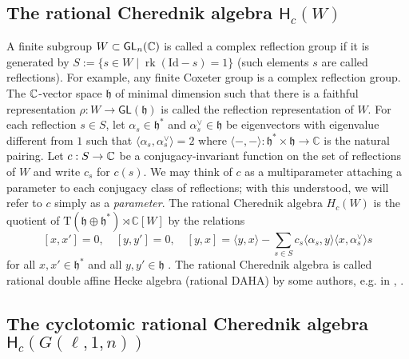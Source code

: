 \documentclass[12pt]{amsart}
\numberwithin{equation}{section}
\theoremstyle{definition}
\newcommand{\hstar}{\mathfrak{h}^*}
\newcommand{\mfh}{\mathfrak{h}}
\newcommand{\rk}{\operatorname{rk}}
\begin{document}
 
\subsection{The rational Cherednik algebra $\mathsf{H}_c(W)$} A finite subgroup $W\subset \mathsf{GL}_n(\mathbb{C})$ is called a complex reflection group if it is generated by $S:=\{s\in W\mid\rk (\mathrm{Id}-s)=1\}$ (such elements $s$ are called reflections). For example, any finite Coxeter group is a complex reflection group. %
The $\mathbb{C}$-vector space $\mathfrak{h}$ of minimal dimension such that there is a faithful representation $\rho:W\rightarrow \mathsf{GL}(\mathfrak{h})$ is called the reflection representation of $W$. %
For each reflection $s\in S$, let $\alpha_s\in \mathfrak{h}^*$ and $\alpha_s^\vee\in\mathfrak{h}$ be eigenvectors with eigenvalue different from $1$ such that $\langle \alpha_s,\alpha_s^\vee\rangle=2$ where $\langle-,-\rangle:\hstar\times\mathfrak{h}\longrightarrow\mathbb{C}$ is the natural pairing. 
Let $c:S\rightarrow \mathbb{C}$ be a conjugacy-invariant function on the set of reflections of $W$ and write $c_s$ for $c(s)$. We may think of $c$ as a multiparameter attaching a parameter to each conjugacy class of reflections; with this understood, we will refer to $c$ simply as a \textit{parameter}. The rational Cherednik algebra $H_c(W)$ is the quotient of $\mathrm{T}(\mathfrak{h}\oplus\hstar)\rtimes \mathbb{C}[W]$ by the relations $$[x,x']=0,\quad[y,y']=0,\quad[y,x]=\langle y,x \rangle -\sum_{s\in S} c_s\langle \alpha_s,y\rangle \langle x,\alpha_s^\vee\rangle s$$
for all $x,x'\in\hstar$ and all $y,y'\in\mathfrak{h}$ \cite{EtingofGinzburg2002}. The rational Cherednik algebra is called rational double affine Hecke algebra (rational DAHA) by some authors, e.g. in \cite{ShanVasserot2012}, \cite{VV}.

\subsection{The cyclotomic rational Cherednik algebra $\mathsf{H}_c(G(\ell,1,n))$}\label{RCAparams1}
\end{document}
